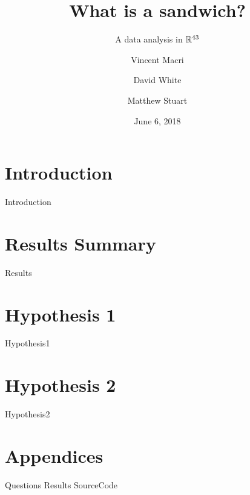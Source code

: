 

\title{What is a sandwich?}
\subtitle{A data analysis in $\mathbb{R}^{43}$}
\author{Vincent Macri \and David White \and Matthew Stuart}
\date{June 6, 2018}


	\maketitle
	
	\tableofcontents
	\clearpage
	\part{Introduction}\label{part:introduction}
		{Introduction}
	\part{Results Summary}\label{part:results}
		{Results}
	\part{Hypothesis 1}\label{part:hypothesis1}
		{Hypothesis1}
	\part{Hypothesis 2}\label{part:hypothesis2}
		{Hypothesis2}
	\appendix
	\part{Appendices}\label{part:appendix}
		{Questions}
		{Results}
		{SourceCode}
	\nocite{*}
	\printbibliography

